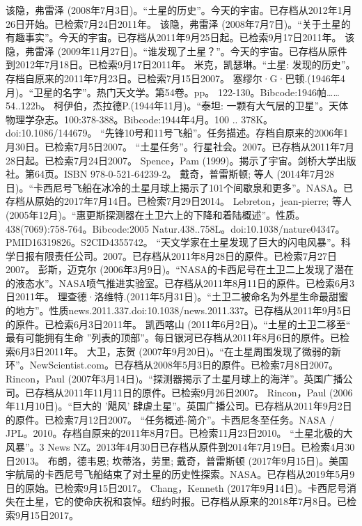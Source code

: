 \begin{enumerate}
 该隐，弗雷泽 (2008年7月3日)。“土星的历史”。今天的宇宙。已存档从2012年1月26日开始。已检索7月24日2011年。
 该隐，弗雷泽 (2008年7月7日)。“关于土星的有趣事实”。今天的宇宙。已存档从2011年9月25日起。已检索9月17日2011年。
 该隐，弗雷泽 (2009年11月27日)。“谁发现了土星？”。今天的宇宙。已存档从原件到2012年7月18日。已检索9月17日2011年。
 米克，凯瑟琳。“土星: 发现的历史”。存档自原来的2011年7月23日。已检索7月15日2007。
 塞缪尔·G·巴顿.(1946年4月)。“卫星的名字”。热门天文学。第54卷。pp。 122-130。Bibcode:1946帕…… 54..122b。
 柯伊伯，杰拉德P.(1944年11月)。“泰坦: 一颗有大气层的卫星”。天体物理学杂志。100:378-388。Bibcode:1944年4月。100 .. 378K。doi:10.1086/144679。
 “先锋10号和11号飞船”。任务描述。存档自原来的2006年1月30日。已检索7月5日2007。
 “土星任务”。行星社会。2007。已存档从2011年7月28日起。已检索7月24日2007。
 Spence，Pam (1999)。揭示了宇宙。剑桥大学出版社。第64页。ISBN 978-0-521-64239-2。
 戴奇，普雷斯顿; 等人 (2014年7月28日)。“卡西尼号飞船在冰冷的土星月球上揭示了101个间歇泉和更多”。NASA。已存档从原始的2017年7月14日。已检索7月29日2014。
 Lebreton，jean-pierre; 等人 (2005年12月)。“惠更斯探测器在土卫六上的下降和着陆概述”。性质。438(7069):758-764。Bibcode:2005 Natur.438..758L。doi:10.1038/nature04347。PMID16319826。S2CID4355742。  
 “天文学家在土星发现了巨大的闪电风暴”。科学日报有限责任公司。2007。已存档从2011年8月28日的原件。已检索7月27日2007。
 彭斯，迈克尔 (2006年3月9日)。“NASA的卡西尼号在土卫二上发现了潜在的液态水”。NASA喷气推进实验室。已存档从2011年8月11日的原件。已检索6月3日2011年。
 理查德·洛维特.(2011年5月31日)。“土卫二被命名为外星生命最甜蜜的地方”。性质news.2011.337.doi:10.1038/news.2011.337。已存档从2011年9月5日的原件。已检索6月3日2011年。
 凯西喀山 (2011年6月2日)。“土星的土卫二移至“ 最有可能拥有生命 ”列表的顶部”。每日银河已存档从2011年8月6日的原件。已检索6月3日2011年。
 大卫，志贺 (2007年9月20日)。“在土星周围发现了微弱的新环”。NewScientist.com。已存档从2008年5月3日的原件。已检索7月8日2007。
 Rincon，Paul (2007年3月14日)。“探测器揭示了土星月球上的海洋”。英国广播公司。已存档从2011年11月11日的原件。已检索9月26日2007。
 Rincon，Paul (2006年11月10日)。“巨大的 '飓风' 肆虐土星”。英国广播公司。已存档从2011年9月2日的原件。已检索7月12日2007。
 “任务概述-简介”。卡西尼冬至任务。NASA / JPL。2010。存档自原来的2011年8月7日。已检索11月23日2010。
 “土星北极的大风暴”。3 News NZ。2013年4月30日已存档从原件到2014年7月19日。已检索4月30日2013。
 布朗，德韦恩; 坎蒂洛，劳里; 戴奇，普雷斯顿 (2017年9月15日)。美国宇航局的卡西尼号飞船结束了对土星的历史性探索。NASA。已存档从2019年5月9日的原始。已检索9月15日2017。
 Chang，Kenneth (2017年9月14日)。卡西尼号消失在土星，它的使命庆祝和哀悼。纽约时报。已存档从原来的2018年7月8日。已检索9月15日2017。

\end{enumerate}
